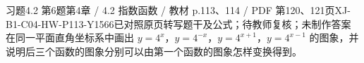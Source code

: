 \par\noindent\begin{minipage}{\linewidth}
\begin{bankitem}{习题4.2 第6题}{第4章 / 4.2 指数函数 / 教材 p.113、114 / PDF 第120、121页}{XJ-B1-C04-HW-P113-Y1566}{已对照原页转写题干及公式；待教师复核；未制作答案}
在同一平面直角坐标系中画出 $y=4^x$，$y=4^{-x}$，$y=4^{x+1}$，$y=4^{x-1}$ 的图象，并说明后三个函数的图象分别可以由第一个函数的图象怎样变换得到。
\end{bankitem}
\end{minipage}\par\medskip
